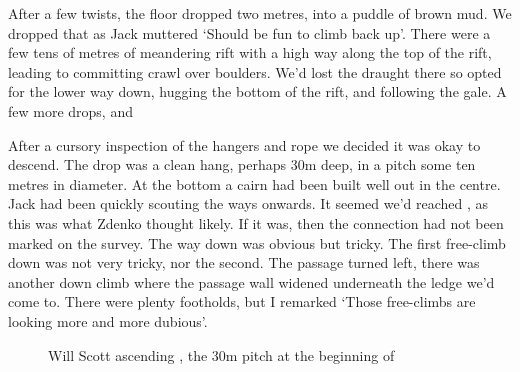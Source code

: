 After a few twists, the floor dropped two metres, into a puddle of brown mud. We dropped that as Jack muttered `Should be fun to climb back up'. There were a few tens of metres of meandering rift with a high way along the top of the rift, leading to committing crawl over boulders. We'd lost the draught there so opted for the lower way down, hugging the bottom of the rift, and following the gale. A few more drops, and 

After a cursory inspection of the hangers and rope we decided it was okay to descend. The drop was a clean hang, perhaps 30m deep, in a pitch some ten metres in diameter. At the bottom a cairn had been built well out in the centre. Jack had been quickly scouting the ways onwards. It seemed we'd reached , as this was what Zdenko thought likely. If it was, then the connection had not been marked on the survey. The way down was obvious but tricky. The first free-climb down was not very tricky, nor the second. The passage turned left, there was another down climb where the passage wall widened underneath the ledge we'd come to. There were plenty footholds, but I remarked `Those free-climbs are looking more and more dubious'. 

\begin{figure}[t!]
\centering
{}
\caption{Will Scott ascending \protect{}, the 30m pitch at the beginning of \protect{} }
\label{Rokovobrezno}
\end{figure}

